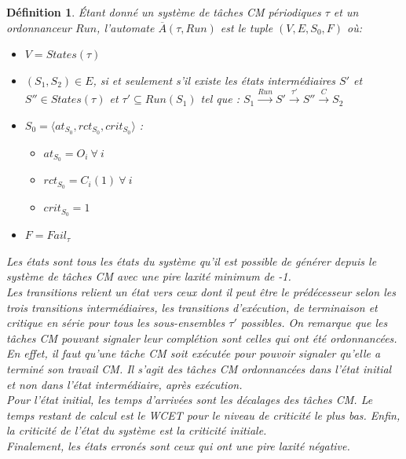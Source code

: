 \documentclass[12pt,a4paper,oneside]{book}
\theoremstyle{break}
\newtheorem{defin}{Définition}[chapter]
\theoremstyle{breakplain}
\begin{document}
\begin{defin} 
\label{per:auto}
Étant donné un système de tâches CM périodiques $\tau$ et un ordonnanceur $Run$, l'automate $\overline{A}(\tau,Run)$ est le tuple $(V, E, S_0, F)$ où:
\begin{itemize}
\item  $V=States(\tau)$
\item $(S_1,S_2) \in E$, si et seulement s'il existe les états intermédiaires $S'$ et $S'' \in States(\tau)$ et $\tau' \subseteq Run(S_1) $ tel que : $S_1\xrightarrow{Run}S'\xrightarrow{\tau'}S''\xrightarrow{C}S_2$
\item $S_0 = \langle at_{S_0}, rct_{S_0}, crit_{S_0} \rangle$ :\begin{itemize}
\item $at_{S_0} = O_i\ \forall\ i$
\item $rct_{S_0} = C_i(1)\ \forall\ i$
\item $crit_{S_0} = 1$
\end{itemize}
\item $F = Fail_\tau$
\end{itemize}
Les états sont tous les états du système qu'il est possible de générer depuis le système de tâches CM avec une pire laxité minimum de -1.\\

Les transitions relient un état vers ceux dont il peut être le prédécesseur selon les trois transitions intermédiaires, les transitions d'exécution, de terminaison et critique en série pour tous les sous-ensembles $\tau'$ possibles. On remarque que les tâches CM pouvant signaler leur complétion sont celles qui ont été ordonnancées. En effet, il faut qu'une tâche CM soit exécutée pour pouvoir signaler qu'elle a terminé son travail CM. Il s'agit des tâches CM ordonnancées dans l'état initial et non dans l'état intermédiaire, après exécution.\\

Pour l'état initial, les temps d'arrivées sont les décalages des tâches CM. Le temps restant de calcul est le WCET pour le niveau de criticité le plus bas. Enfin, la criticité de l'état du système est la criticité initiale.\\

Finalement, les états erronés sont ceux qui ont une pire laxité négative.\\
\end{defin} 
\end{document}
